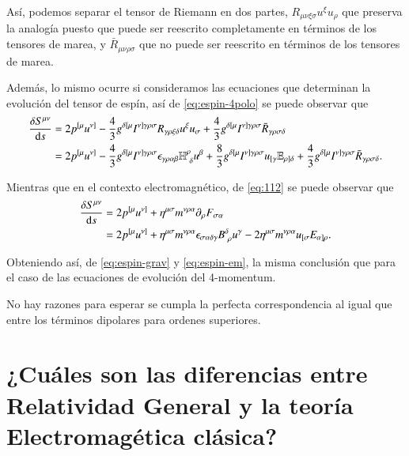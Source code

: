 Así, podemos separar el tensor de Riemann en dos partes, $R_{\mu \nu \xi \sigma} u^{\xi} u_{\rho}$ que preserva la analogía puesto que puede ser reescrito completamente en términos de los tensores de marea, y $\bar{R}_{\mu \nu \rho \sigma}$ que no puede ser reescrito en términos de los tensores de marea.

Además, lo mismo ocurre si consideramos las ecuaciones que determinan la evolución del tensor de espín, así de \eqref{eq:espin-4polo} se puede observar que
\begin{align}
\cd{S^{\mu \nu}} &= 2p^{[\mu} u^{\nu]} - \frac{4}{3} g^{\delta [ \mu} I^{\nu] \gamma \rho \sigma} R_{\gamma \rho \xi \delta} u^{\xi} u_{\sigma} + \frac{4}{3} g^{\delta [ \mu} I^{\nu] \gamma \rho \sigma} \bar{R}_{\gamma \rho \sigma \delta} \nonumber\\
&= 2p^{[\mu} u^{\nu]} - \frac{4}{3} g^{\delta [ \mu} I^{\nu] \gamma \rho \sigma} \epsilon_{\gamma \rho \alpha \beta} \mathbb{H}^{\rho}_{\ \delta} u^{\beta} + \frac{8}{3} g^{\delta [ \mu} I^{\nu] \gamma \rho \sigma} u_{[\gamma} \mathbb{E}_{\rho] \delta} + \frac{4}{3} g^{\delta [ \mu} I^{\nu] \gamma \rho \sigma} \bar{R}_{\gamma \rho \sigma \delta}. \label{eq:espin-grav}
\end{align}

Mientras que en el contexto electromagnético, de \eqref{eq:112} se puede observar que
\begin{align}
\frac{\delta S^{\mu \nu}}{\mathrm{d}s} &= 2p^{[\mu} u^{\nu]} + \eta^{\mu \sigma} m^{\nu \rho \alpha} \partial_{\rho} F_{\sigma \alpha} \nonumber \\
&=  2p^{[\mu} u^{\nu]} + \eta^{\mu \sigma} m^{\nu \rho \alpha} \epsilon_{\sigma \alpha \delta \gamma} \mathit{B}^{\delta}_{\ \rho} u^{\gamma} - 2\eta^{\mu \sigma} m^{\nu \rho \alpha} u_{[\sigma} \mathit{E}_{\alpha] \rho}. \label{eq:espin-em}
\end{align}

Obteniendo así, de \eqref{eq:espin-grav} y \eqref{eq:espin-em}, la misma conclusión que para el caso de las ecuaciones de evolución del 4-momentum.

No hay razones para esperar se cumpla la perfecta correspondencia al igual que entre los términos dipolares para ordenes superiores.

\section{¿Cuáles son las diferencias entre Relatividad General y la teoría Electromagética clásica?}

